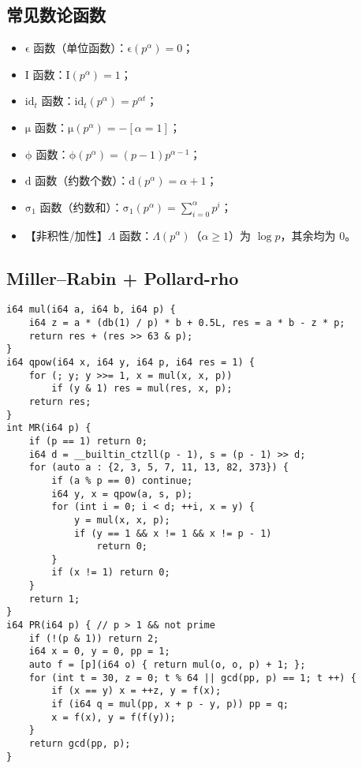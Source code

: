 \documentclass[a4paper,landscape,twocolumn]{ctexart}
\begin{document}
\subsection{常见数论函数}

\begin{itemize}
\item $\mathrm{\epsilon}$ 函数（单位函数）：$\mathrm{\epsilon} (p ^ \alpha) = 0$；
\item $\mathrm{I}$ 函数：$\mathrm{I} (p ^ \alpha) = 1$；
\item $\mathrm{id}_t$ 函数：$\mathrm{id}_t (p ^ \alpha) = p ^ {\alpha t}$；
\item $\mathrm{\mu}$ 函数：$\mathrm{\mu} (p ^ \alpha) = - \left [ \alpha = 1 \right ]$；
\item $\mathrm{\phi}$ 函数：$\mathrm{\phi} (p ^ \alpha) = (p - 1) p ^ {\alpha - 1}$；
\item $\mathrm{d}$ 函数（约数个数）：$\mathrm{d} (p ^ \alpha) = \alpha + 1$；
\item $\mathrm{\sigma}_1$ 函数（约数和）：$\mathrm{\sigma}_1 (p ^ \alpha) = \sum_{i = 0}^{\alpha} p ^ i$；
\item 【非积性/加性】$\Lambda$ 函数：$\Lambda (p ^ \alpha)$（$\alpha \geq 1$）为 $\log p$，其余均为 $0$。
\end{itemize}

\subsection{Miller–Rabin + Pollard-rho}

\begin{lstlisting}
i64 mul(i64 a, i64 b, i64 p) {
	i64 z = a * (db(1) / p) * b + 0.5L, res = a * b - z * p;
	return res + (res >> 63 & p);
}
i64 qpow(i64 x, i64 y, i64 p, i64 res = 1) {
	for (; y; y >>= 1, x = mul(x, x, p))
		if (y & 1) res = mul(res, x, p);
	return res;
}
int MR(i64 p) {
	if (p == 1) return 0;
	i64 d = __builtin_ctzll(p - 1), s = (p - 1) >> d;
	for (auto a : {2, 3, 5, 7, 11, 13, 82, 373}) {
		if (a % p == 0) continue;
		i64 y, x = qpow(a, s, p);
		for (int i = 0; i < d; ++i, x = y) {
			y = mul(x, x, p);
			if (y == 1 && x != 1 && x != p - 1)
				return 0;
		}
		if (x != 1) return 0;
	}
	return 1;
}
i64 PR(i64 p) { // p > 1 && not prime
	if (!(p & 1)) return 2;
	i64 x = 0, y = 0, pp = 1;
	auto f = [p](i64 o) { return mul(o, o, p) + 1; };
	for (int t = 30, z = 0; t % 64 || gcd(pp, p) == 1; t ++) {
		if (x == y) x = ++z, y = f(x);
		if (i64 q = mul(pp, x + p - y, p)) pp = q;
		x = f(x), y = f(f(y));
	}
	return gcd(pp, p);
}
\end{lstlisting}
\end{document}
